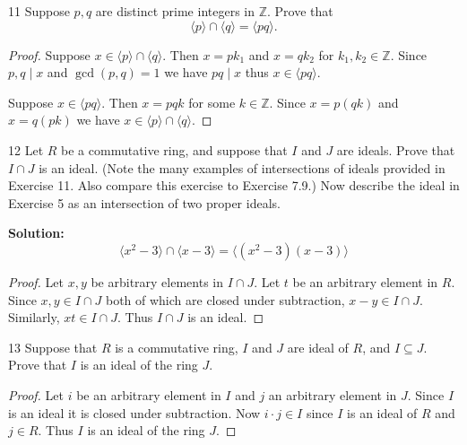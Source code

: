 \begin{problem}{11}
    Suppose $p, q$ are distinct prime integers in $\mathbb{Z}$.
    Prove that 
    \[\langle p \rangle \cap \langle q \rangle = \langle pq \rangle.\]
\end{problem}
\solved

\begin{proof}
    Suppose $x \in \langle p \rangle \cap \langle q \rangle$.
    Then $x = p k_1$ and $x = q k_2$ for $k_1, k_2 \in \mathbb{Z}$.
    Since $p, q \mid x$ and $\gcd(p, q) = 1$ we have $pq \mid x$ thus $x \in \langle pq \rangle$.

    Suppose $x \in \langle pq \rangle$.
    Then $x = p q k$ for some $k \in \mathbb{Z}$.
    Since $x = p(qk)$ and $x = q(pk)$ we have $x \in \langle p \rangle \cap \langle q \rangle$.
\end{proof}

\begin{problem}{12}
    Let $R$ be a commutative ring, and suppose that $I$ and $J$ are 
        ideals. Prove that $I \cap J$ is an ideal.
    (Note the many examples of intersections of ideals provided in Exercise 11.
    Also compare this exercise to Exercise 7.9.) Now describe the ideal in Exercise 5 
    as an intersection of two proper ideals.
\end{problem}
\solved

\textbf{Solution: }
\[\langle x^2 - 3 \rangle \cap \langle x - 3 \rangle = \langle (x^2 - 3)(x - 3) \rangle\]

\begin{proof}
    Let $x, y$ be arbitrary elements in $I \cap J$.
    Let $t$ be an arbitrary element in $R$.
    Since $x,y \in I \cap J$ both of which are closed under subtraction,
        $x - y \in I \cap J$.
    Similarly, $xt \in I \cap J$.
    Thus $I \cap J$ is an ideal.
\end{proof}

\begin{problem}{13}
    Suppose that $R$ is a commutative ring, $I$ and $J$ are ideal of $R$,
    and $I \subseteq J$. Prove that $I$ is an ideal of the ring $J$.
\end{problem}
\solved

\begin{proof}
    Let $i$ be an arbitrary element in $I$ and $j$ an arbitrary element in $J$.
    Since $I$ is an ideal it is closed under subtraction.
    Now $i \cdot j \in I$ since $I$ is an ideal of $R$ and $j \in R$.
    Thus $I$ is an ideal of the ring $J$.
\end{proof}

